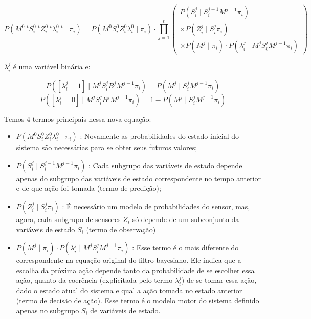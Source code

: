 \begin{equation}
    P \left( M^{0: t} S_i^{0: t} Z_i^{0: t} \lambda_i^{0: t}  \mid \pi_i \right) = P \left( M^0 S_i^0 Z_i^0 \lambda_i^0 \mid \pi_i \right) \cdot \prod\limits_{j =1}^{t} 
        \left(
            \begin{array}{l}
                P \left( S_i^j \mid S_i^{j -1} M^{j-1} \pi_i \right) \\
                \times P \left( Z_i^j \mid S_i^j \pi_i \right) \\
                \times P \left( M^j \mid \pi_i \right) \cdot P \left( \lambda_i^j \mid M^j S_i^j M^{j-1} \pi_i \right)
            \end{array}
        \right)
\end{equation}

$ \lambda_i^j $ é uma variável binária e:

\begin{equation}
    P \left( \left[ \lambda_i^j = 1 \right] \mid M^j S_i^j B^j M^{j -1} \pi_i \right) = P \left( M^j \mid S_i^j M^{j -1} \pi_i \right)
\end{equation}
\begin{equation}
    P \left( \left[ \lambda_i^j = 0 \right] \mid M^j S_i^j B^j M^{j -1} \pi_i \right) = 1 - P \left( M^j \mid S_i^j M^{j -1} \pi_i \right)
\end{equation}

Temos 4 termos principais nessa nova equação:

\begin{itemize}
    \item $ P \left( M^0 S_i^0 Z_i^0 \lambda_i^0 \mid \pi_i \right) $ : Novamente as probabilidades do estado inicial do sistema são necessárias para se obter seus futuros valores;
    \item $ P \left( S_i^j \mid S_i^{j-1} M^{j-1} \pi_i \right) $ : Cada subgrupo das variáveis de estado  depende apenas do subgrupo das variáveis de estado correspondente no tempo anterior e de que ação foi tomada (termo de predição);
    \item $ P \left( Z_i^j \mid S_i^j \pi_i \right) $ : É necessário um modelo de probabilidades do sensor, mas, agora, cada subgrupo de sensores $ Z_i $ só depende de um subconjunto da variáveis de estado $ S_i $ (termo de observação)
    \item $ P \left( M^j \mid \pi_i \right) \cdot P \left( \lambda_i^j \mid M^j S_i^j M^{j-1} \pi_i \right) $ : Esse termo é o mais diferente do correspondente na equação original do filtro bayesiano. Ele indica que a escolha da próxima ação depende tanto da probabilidade de se escolher essa ação, quanto da coerência (explicitada pelo termo $ \lambda_i^j $) de se tomar essa ação, dado o estado atual do sistema e qual a ação tomada no estado anterior (termo de decisão de ação). Esse termo é o modelo motor do sistema definido apenas no subgrupo $ S_i $ de variáveis de estado.
\end{itemize}

